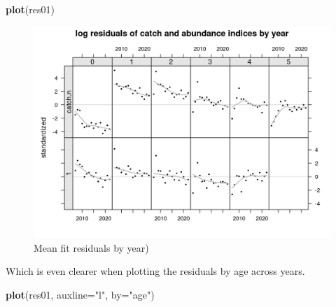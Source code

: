 \documentclass[
]{book}
\newenvironment{Shaded}{\begin{snugshade}}{\end{snugshade}}
\newcommand{\AttributeTok}[1]{\textcolor[rgb]{0.13,0.29,0.53}{#1}}
\newcommand{\FunctionTok}[1]{\textcolor[rgb]{0.13,0.29,0.53}{\textbf{#1}}}
\newcommand{\NormalTok}[1]{#1}
\newcommand{\StringTok}[1]{\textcolor[rgb]{0.31,0.60,0.02}{#1}}
\begin{document}
\begin{Shaded}
\begin{Highlighting}[]
\FunctionTok{plot}\NormalTok{(res01)}
\end{Highlighting}
\end{Shaded}

\begin{figure}
\centering
\includegraphics{_bookdown_files/_main_files/figure-html/meanresbyyear-1.png}
\caption{\label{fig:meanresbyyear}Mean fit residuals by year)}
\end{figure}

Which is even clearer when plotting the residuals by age across years.

\begin{Shaded}
\begin{Highlighting}[]
\FunctionTok{plot}\NormalTok{(res01, }\AttributeTok{auxline=}\StringTok{"l"}\NormalTok{, }\AttributeTok{by=}\StringTok{"age"}\NormalTok{)}
\end{Highlighting}
\end{Shaded}
\end{document}
